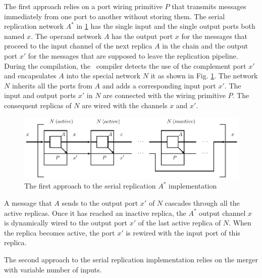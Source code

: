 The first approach relies on a port wiring primitive $P$ that transmits messages immediately from one port to another without storing them. The serial replication network $A^{*}$ in \ref{fig:ffp_new} has the single input and the single output ports both named $x$. The operand network $A$ has the output port $x$ for the messages that proceed to the input channel of the next replica $A$ in the chain and the output port $x'$ for the messages that are supposed to leave the replication pipeline. During the compilation, the \ak\ compiler detects the use of the complement port $x'$ and encapsulates $A$ into the special network $N$ it as shown in Fig. \ref{fig:ffp_new}. The network $N$ inherits all the ports from $A$ and adds a corresponding input port $x'$. The input and output ports $x'$ in $N$ are connected with the wiring primitive $P$. The consequent replicas of $N$ are wired with the channels $x$ and $x'$.
\begin{figure}[h!]
\centering
\includegraphics[scale=0.8]{figs/chapter_04_ffp_new.pdf}
\caption{The first approach to the serial replication $A^{*}$ implementation}
\label{fig:ffp_new}
\end{figure}
A message that $A$ sends to the output port $x'$ of $N$ cascades through all the active replicas. Once it has reached an inactive replica, the $A^{*}$ output channel $x$ is dynamically wired to the output port $x'$ of the last active replica of $N$. When the replica becomes active, the port $x'$ is rewired with the input port of this replica.

The second approach to the serial replication implementation relies on the merger with variable number of inputs. 




